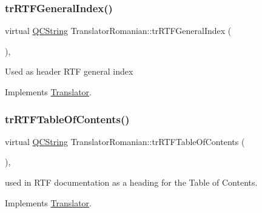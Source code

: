 \mbox{\label{class_translator_romanian_a144ea1b1691b8ff7e78d90dbf7765dec}} 
\subsubsection{\texorpdfstring{trRTFGeneralIndex()}{trRTFGeneralIndex()}}
{\footnotesize\ttfamily virtual \mbox{\hyperlink{class_q_c_string}{Q\+C\+String}} Translator\+Romanian\+::tr\+R\+T\+F\+General\+Index (\begin{DoxyParamCaption}{ }\end{DoxyParamCaption})\hspace{0.3cm}{\ttfamily [inline]}, {\ttfamily [virtual]}}

Used as header R\+TF general index 

Implements \mbox{\hyperlink{class_translator}{Translator}}.

\mbox{\label{class_translator_romanian_a8cb64e880d0e902d2db5b1c3d63960e9}} 
\subsubsection{\texorpdfstring{trRTFTableOfContents()}{trRTFTableOfContents()}}
{\footnotesize\ttfamily virtual \mbox{\hyperlink{class_q_c_string}{Q\+C\+String}} Translator\+Romanian\+::tr\+R\+T\+F\+Table\+Of\+Contents (\begin{DoxyParamCaption}{ }\end{DoxyParamCaption})\hspace{0.3cm}{\ttfamily [inline]}, {\ttfamily [virtual]}}

used in R\+TF documentation as a heading for the Table of Contents. 

Implements \mbox{\hyperlink{class_translator}{Translator}}.

\mbox{\label{class_translator_romanian_a6c522660963399965f2efbcf0d6d58c0}} 

